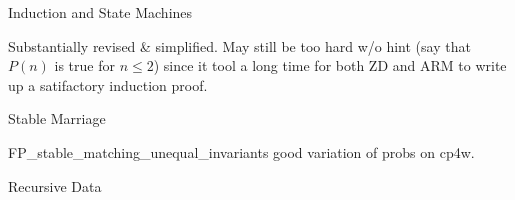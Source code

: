 \documentclass[quiz]{mcs}
\begin{document}
\begin{staffnotes}
\begin{center}
{\large Induction and State Machines}
\end{center}
\end{staffnotes}


\begin{staffnotes}
Substantially revised \& simplified.  May still be too hard w/o hint
(say that $P(n)$ is true for $n \leq 2$) since it tool a long time for
both ZD and ARM to write up a satifactory induction proof.
\end{staffnotes}


%
%
%
%

\begin{staffnotes}
\begin{center}
{\large Stable Marriage}
\end{center}
\end{staffnotes}




\examspace

\begin{staffnotes}
FP\_stable\_matching\_unequal\_invariants good variation of probs on cp4w.
\end{staffnotes}

\begin{staffnotes}
\begin{center}
{\large Recursive Data}
\end{center}
\end{staffnotes}
\end{document}
